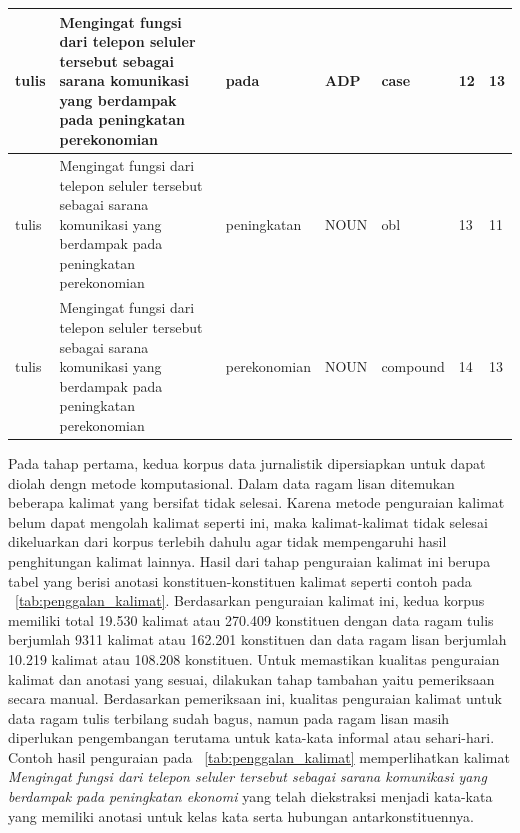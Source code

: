 \begin{center}
\begin{table}
\begin{tiny}
\begin{tabulary}{1\textwidth}{| L | L | L | L | L | L | L |}
tulis & Mengingat fungsi dari telepon seluler tersebut sebagai sarana komunikasi yang berdampak pada peningkatan perekonomian & pada & ADP & case & 12 & 13 \\ \hline
tulis & Mengingat fungsi dari telepon seluler tersebut sebagai sarana komunikasi yang berdampak pada peningkatan perekonomian & peningkatan & NOUN & obl & 13 & 11 \\ \hline
tulis & Mengingat fungsi dari telepon seluler tersebut sebagai sarana komunikasi yang berdampak pada peningkatan perekonomian & perekonomian & NOUN & compound & 14 & 13 \\ 
\hline
  \end{tabulary}  
\end{tiny}
\end{table}
\end{center}

Pada tahap pertama, kedua korpus data jurnalistik dipersiapkan untuk dapat diolah dengn metode komputasional. Dalam data ragam lisan ditemukan beberapa kalimat yang bersifat tidak selesai. Karena metode penguraian kalimat belum dapat mengolah kalimat seperti ini, maka kalimat-kalimat tidak selesai dikeluarkan dari korpus terlebih dahulu agar tidak mempengaruhi hasil penghitungan kalimat lainnya. Hasil dari tahap penguraian kalimat ini berupa tabel yang berisi anotasi konstituen-konstituen kalimat seperti contoh pada \tab~\ref{tab:penggalan_kalimat}. Berdasarkan penguraian kalimat ini, kedua korpus memiliki total 19.530 kalimat atau 270.409 konstituen dengan data ragam tulis berjumlah 9311 kalimat atau 162.201 konstituen dan data ragam lisan berjumlah 10.219 kalimat atau 108.208 konstituen. Untuk memastikan kualitas penguraian kalimat dan anotasi yang sesuai, dilakukan tahap tambahan yaitu pemeriksaan secara manual. Berdasarkan pemeriksaan ini, kualitas penguraian kalimat untuk data ragam tulis terbilang sudah bagus, namun pada ragam lisan masih diperlukan pengembangan terutama untuk kata-kata informal atau sehari-hari. Contoh hasil penguraian pada \tab~\ref{tab:penggalan_kalimat} memperlihatkan kalimat \textit{Mengingat fungsi dari telepon seluler tersebut sebagai sarana komunikasi yang berdampak pada peningkatan ekonomi} yang telah diekstraksi menjadi kata-kata yang memiliki anotasi untuk kelas kata serta hubungan antarkonstituennya. 

